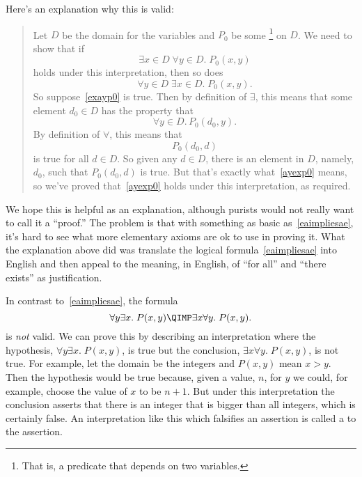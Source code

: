 \begin{editingnoes}
Here's an explanation why this is valid:

\begin{quote}
Let $D$ be the domain for the variables and $P_0$ be some
\footnote{That is, a predicate that depends on two variables.}
on $D$.  We need to show that if
\begin{equation}\label{exayp0}
\exists x \in D\; \forall y \in D.\; P_0(x,y)
\end{equation}
holds under this interpretation, then so does
\begin{equation}\label{ayexp0}
\forall y \in D\; \exists x \in D.\; P_0(x,y).
\end{equation}
So suppose~\eqref{exayp0} is true.  Then by definition of $\exists$, this
means that some element $d_0 \in D$ has the property that
\[
\forall y \in D.\, P_0(d_0, y).
\]
By definition of $\forall$, this means that
\[
P_0(d_0,d)
\]
is true for all $d \in D$.  So given any $d \in D$, there is an element in
$D$, namely, $d_0$, such that $P_0(d_0,d)$ is true.  But that's exactly
what~\eqref{ayexp0} means, so we've proved that~\eqref{ayexp0} holds under
this interpretation, as required.
\end{quote}

We hope this is helpful as an explanation, although purists would not
really want to call it a ``proof.''  The problem is that with something as basic
as~\eqref{eaimpliesae}, it's hard to see what more elementary axioms are
ok to use in proving it.  What the explanation above did was translate the
logical formula~\eqref{eaimpliesae} into English and then appeal to the
meaning, in English, of ``for all'' and ``there exists'' as justification.

In contrast to~\eqref{eaimpliesae}, the formula
\begin{equation}\label{aenotimplyea}
\forall y \exists x.\; P(x,y) \QIMP \exists x \forall y.\; P(x,y).
\end{equation}
is \emph{not} valid.  We can prove this by describing an
interpretation where the hypothesis, $\forall y \exists x.\; P(x,y)$, is
true but the conclusion, $\exists x \forall y.\; P(x,y)$, is not true.
For example, let the domain be the integers and $P(x,y)$ mean $x > y$.
Then the hypothesis would be true because, given a value, $n$, for $y$ we
could, for example, choose the value of $x$ to be $n+1$.  But under this
interpretation the conclusion asserts that there is an integer that is
bigger than all integers, which is certainly false.  An interpretation
like this which falsifies an assertion is called a  to
the assertion.


\end{editingnoes}

